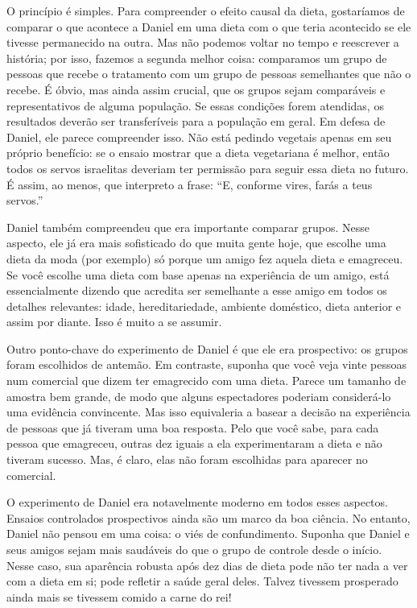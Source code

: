 \documentclass[11pt,a5paper,twoside]{book}
\begin{document}
O princípio é simples. Para compreender o efeito causal da dieta, gostaríamos de comparar o que acontece a Daniel em uma dieta com o que teria acontecido se ele tivesse permanecido na outra. Mas não podemos voltar no tempo e reescrever a história; por isso, fazemos a segunda melhor coisa: comparamos um grupo de pessoas que recebe o tratamento com um grupo de pessoas semelhantes que não o recebe. É óbvio, mas ainda assim crucial, que os grupos sejam comparáveis e representativos de alguma população. Se essas condições forem atendidas, os resultados deverão ser transferíveis para a população em geral. Em defesa de Daniel, ele parece compreender isso. Não está pedindo vegetais apenas em seu próprio benefício: se o ensaio mostrar que a dieta vegetariana é melhor, então todos os servos israelitas deveriam ter permissão para seguir essa dieta no futuro. É assim, ao menos, que interpreto a frase: “E, conforme vires, farás a teus servos.”

Daniel também compreendeu que era importante comparar grupos. Nesse aspecto, ele já era mais sofisticado do que muita gente hoje, que escolhe uma dieta da moda (por exemplo) só porque um amigo fez aquela dieta e emagreceu. Se você escolhe uma dieta com base apenas na experiência de um amigo, está essencialmente dizendo que acredita ser semelhante a esse amigo em todos os detalhes relevantes: idade, hereditariedade, ambiente doméstico, dieta anterior e assim por diante. Isso é muito a se assumir.

Outro ponto-chave do experimento de Daniel é que ele era prospectivo: os grupos foram escolhidos de antemão. Em contraste, suponha que você veja vinte pessoas num comercial que dizem ter emagrecido com uma dieta. Parece um tamanho de amostra bem grande, de modo que alguns espectadores poderiam considerá-lo uma evidência convincente. Mas isso equivaleria a basear a decisão na experiência de pessoas que já tiveram uma boa resposta. Pelo que você sabe, para cada pessoa que emagreceu, outras dez iguais a ela experimentaram a dieta e não tiveram sucesso. Mas, é claro, elas não foram escolhidas para aparecer no comercial.

O experimento de Daniel era notavelmente moderno em todos esses aspectos. Ensaios controlados prospectivos ainda são um marco da boa ciência. No entanto, Daniel não pensou em uma coisa: o viés de confundimento. Suponha que Daniel e seus amigos sejam mais saudáveis do que o grupo de controle desde o início. Nesse caso, sua aparência robusta após dez dias de dieta pode não ter nada a ver com a dieta em si; pode refletir a saúde geral deles. Talvez tivessem prosperado ainda mais se tivessem comido a carne do rei!
\end{document}
